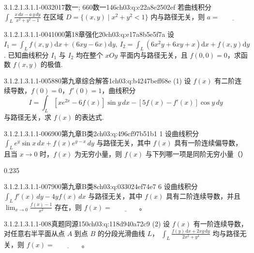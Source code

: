 \begin{q}{3.1.2.1.3.1.1-003}{2017数一; 660数一146}{ch03:q:c22a8e2502ef}
若曲线积分 $\displaystyle\int_L \frac{x\,dx-a\,y\,dy}{x^2+y^2-1}$ 在区域 $D=\{(x,y)\mid x^2+y^2<1\}$ 内与路径无关，则 $a=\underline{\hspace{4em}}$
\end{q}

\begin{q}{3.1.2.1.3.1.1-004}{1000第18章强化20}{ch03:q:e17a8b5e5f7a}
设 $\displaystyle I_1=\int_L f(x,y)\mathrm{d}x+(6xy-6x)\mathrm{d}y,\ I_2=\int_L (6x^2y+6xy+x)\mathrm{d}x+f(x,y)\mathrm{d}y$. 已知曲线积分 $I_1$ 与 $I_2$ 均在整个 $xOy$ 平面内与路径无关，且 $f(0,0)=0$，求函数 $f(x,y)$ 的极值.
\end{q}

\begin{q}{3.1.2.1.3.1.1-005}{880第九章综合解答1}{ch03:q:b4247beff68e}
(1) 设 $f(x)$ 有二阶连续导数，$f(0)=0$，$f'(0)=1$，曲线积分
\[ I=\int_L [xe^{2x}-6f(x)]\sin y\,dx-[5f(x)-f'(x)]\cos y\,dy \]
与路径无关，求 $f(x)$ 的表达式.
\end{q}

\begin{q}{3.1.2.1.3.1.1-006}{900第九章B类2}{ch03:q:496cf97b51b1}
1 设曲线积分 $\displaystyle \int_L e^y \sin x\,dx + f(x)e^{y-x}\,dy$ 与路径无关，其中 $f(x)$ 具有一阶连续偏导数，且当 $x\to 0$ 时，$f(x)$ 为无穷小量，则 $f(x)$ 与下列哪一项是同阶无穷小量（\quad）
\begin{opts}{0.235}
\hfill{}\hfill{}\hfill{}
\end{opts}
\end{q}

\begin{q}{3.1.2.1.3.1.1-007}{900第九章B类8}{ch03:q:033024ef74e7}
6 设曲线积分 $\displaystyle \int_L f'(x)\,dy - 4y f(x)\,dx$ 与路径无关，其中 $f(x)$ 具有二阶连续导数，并且 $\displaystyle \lim_{x\to 0} \frac{f(x)-1}{x^2}$ 存在，则 $f(x)= \underline{\hspace{4em}}$。
\end{q}

\begin{q}{3.1.2.1.3.1.1-008}{真题同源150}{ch03:q:118d940a72c9}
(2) 设 $f(x)$ 有一阶连续导数，对任意右半平面从点 $A$ 到点 $B$ 的分段光滑曲线 $L$，
$\displaystyle \int_L \frac{f(y)\,\mathrm{d}x + 2xy\,\mathrm{d}y}{2x^2 + y^4}$
均与路径无关，则 $f(x) = \underline{\hspace{4em}}$。
\end{q}

